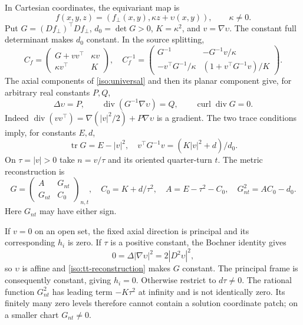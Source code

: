 \documentclass[11pt,a4paper]{article}
\numberwithin{equation}{section}
\theoremstyle{plain}
\theoremstyle{definition}
\theoremstyle{remark}
\begin{document}
In Cartesian coordinates, the equivariant map is
\begin{equation}\label{iso:tt-map}
 f(x,y,z)=(f_\perp(x,y),\kappa z+\upsilon(x,y)),\qquad \kappa\ne0.
\end{equation}
Put $G=(Df_\perp)^{\top}Df_\perp$, $d_0=\det G>0$, $K=\kappa^2$, and
$v=\nabla\upsilon$.  The constant full determinant makes $d_0$ constant.  In
the source splitting,
\begin{equation}\label{iso:tt-block}
 C_f=\begin{pmatrix}G+vv^{\top}&\kappa v\\ \kappa v^{\top}&K\end{pmatrix},
 \quad
 C_f^{-1}=\begin{pmatrix}
 G^{-1}&-G^{-1}v/\kappa\\
 -v^{\top}G^{-1}/\kappa&(1+v^{\top}G^{-1}v)/K
 \end{pmatrix}.
\end{equation}
The axial components of \eqref{iso:universal} and then its planar component
give, for arbitrary real constants $P,Q$,
\begin{equation}\label{iso:tt-pdes}
 \Delta\upsilon=P,\qquad
 \operatorname{div}(G^{-1}\nabla\upsilon)=Q,\qquad
 \operatorname{curl}\operatorname{div}G=0.
\end{equation}
Indeed $\operatorname{div}(vv^{\top})=\nabla(|v|^2/2)+P\nabla\upsilon$ is a
gradient.  The two trace conditions imply, for constants $E,d$,
\[
 \operatorname{tr}G=E-|v|^2,\quad
 v^{\top}G^{-1}v=(K|v|^2+d)/d_0.
\]
On $\tau=|v|>0$ take $n=v/\tau$ and its oriented quarter-turn $t$.
The metric reconstruction is
\begin{equation}\label{iso:tt-reconstruction}
 G=\begin{pmatrix}A&G_{nt}\\G_{nt}&C_0\end{pmatrix}_{n,t},\quad
 C_0=K+d/\tau^2,\quad A=E-\tau^2-C_0,
 \quad G_{nt}^2=AC_0-d_0.
\end{equation}
Here $G_{nt}$ may have either sign.

If $v=0$ on an open set, the fixed axial direction is principal and its
corresponding $h_i$ is zero.  If $\tau$ is a positive constant, the Bochner
identity gives
\[
 0=\Delta|\nabla\upsilon|^2=2|D^2\upsilon|^2,
\]
so $\upsilon$ is affine and \eqref{iso:tt-reconstruction} makes $G$ constant.
The principal frame is consequently constant, giving $h_i=0$.
Otherwise restrict to $d\tau\ne0$.  The rational function $G_{nt}^2$ has leading
term $-K\tau^2$ at infinity and is not identically zero.  Its finitely many
zero levels therefore cannot contain a solution coordinate patch;
on a smaller chart $G_{nt}\ne0$.
\end{document}
